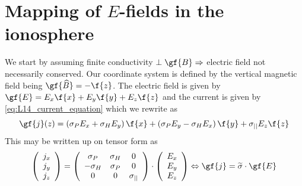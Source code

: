 \section{Mapping of \(E\)-fields in the ionosphere}
We start by assuming finite conductivity \(\perp\gf{B}\Rightarrow \) electric field not necessarily conserved. Our coordinate system is defined by the vertical magnetic field being \(\gf{\widehat{B}}=-\f{z}\). The electric field is given by \(\gf{E}=E_x\f{x}+E_y\f{y}+E_z\f{z}\) and the current is given by \cref{eq:L14_current_equation} which we rewrite as
\begin{equation*}
    \gf{j}(z)=\left(\sigma_{P}E_x+\sigma_{H}E_y\right)\f{x}+\left(\sigma_{P}E_y-\sigma_{H}E_x\right)\f{y}+\sigma_{||}E_z\f{z}
\end{equation*}
This may be written up on tensor form as
\begin{equation*}
    \left(\begin{array}{c}
        j_x\\j_y\\j_z
    \end{array}\right)=\left(\begin{array}{ccc}
        \sigma_P & \sigma_H & 0\\
        -\sigma_H & \sigma_P & 0\\
        0 & 0 & \sigma_{||}
    \end{array}\right)\cdot
    \left(\begin{array}{c}
        E_x\\E_y\\E_z
    \end{array}\right)\Leftrightarrow\gf{j}=\widetilde{\sigma}\cdot\gf{E}
\end{equation*}

